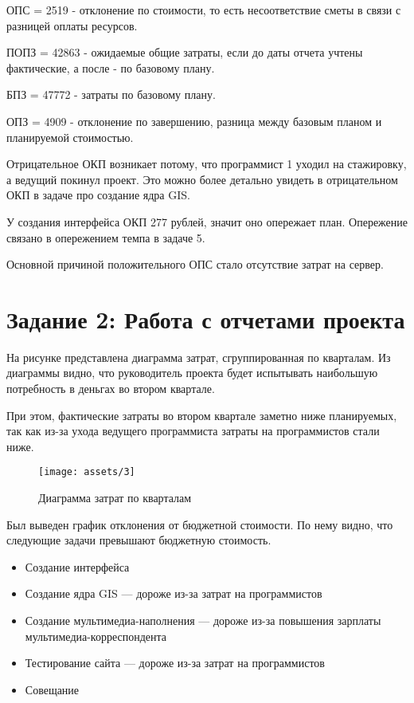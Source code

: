 ОПС = 2519 - отклонение по  стоимости, то есть несоответствие сметы в связи с разницей оплаты ресурсов.

ПОПЗ = 42863 - ожидаемые общие затраты, если до даты отчета учтены фактические, а после - по базовому плану.

БПЗ = 47772 - затраты по базовому плану.

ОПЗ = 4909 - отклонение по завершению, разница между базовым планом и планируемой стоимостью.

Отрицательное ОКП возникает потому, что программист 1 уходил на стажировку, а ведущий покинул проект. Это можно более детально увидеть в отрицательном ОКП в задаче про создание ядра GIS.

У создания интерфейса ОКП 277 рублей, значит оно опережает план. Опережение связано в опережением темпа в задаче 5.

Основной причиной положительного ОПС стало отсутствие затрат на сервер.

\section{Задание 2: Работа с отчетами проекта}

На рисунке представлена диаграмма затрат, сгруппированная по кварталам.
Из диаграммы видно, что руководитель проекта будет испытывать наибольшую потребность в деньгах во втором квартале. 

При этом, фактические затраты во втором квартале заметно ниже планируемых, так как из-за ухода ведущего программиста затраты на программистов стали ниже.

\begin{figure}[H]
    \begin{center}
    \texttt{[image: assets/3]}
    \caption{Диаграмма затрат по кварталам}
    \label{fig:3}
    \end{center}
\end{figure}

Был выведен график отклонения от бюджетной стоимости. По нему видно, что следующие задачи превышают бюджетную стоимость.

\begin{itemize}
	\item Создание интерфейса
	\item Создание ядра GIS --- дороже из-за затрат на программистов
	\item Создание мультимедиа-наполнения --- дороже из-за повышения зарплаты мультимедиа-корреспондента
	\item Тестирование сайта --- дороже из-за затрат на программистов
	\item Совещание
\end{itemize}

